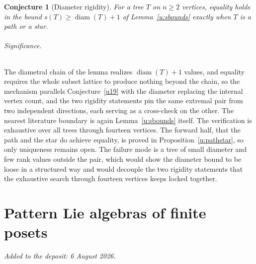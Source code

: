\documentclass[11pt]{article}
\newtheorem{conjecture}{Conjecture}
\theoremstyle{definition}
\begin{document}
\begin{conjecture}[Diameter rigidity]\label{u20}
For a tree $T$ on $n\ge2$ vertices, equality holds in the bound $s(T)\ge\operatorname{diam}(T)+1$ of Lemma~\ref{u:sbounds} exactly when $T$ is a path or a star.
\end{conjecture}

\paragraph{Significance.}
The diametral chain of the lemma realizes $\operatorname{diam}(T)+1$ values, and equality requires the whole subset lattice to produce nothing beyond the chain, so the mechanism parallels Conjecture~\ref{u19} with the diameter replacing the internal vertex count, and the two rigidity statements pin the same extremal pair from two independent directions, each serving as a cross-check on the other.  The nearest literature boundary is again Lemma~\ref{u:sbounds} itself.  The verification is exhaustive over all trees through fourteen vertices.  The forward half, that the path and the star do achieve equality, is proved in Proposition~\ref{u:pathstar}, so only uniqueness remains open.  The failure mode is a tree of small diameter and few rank values outside the pair, which would show the diameter bound to be loose in a structured way and would decouple the two rigidity statements that the exhaustive search through fourteen vertices keeps locked together.

\part{Pattern Lie algebras of finite posets}

\medskip\noindent\emph{Added to the deposit: 6 August 2026.}\par\medskip
\end{document}
